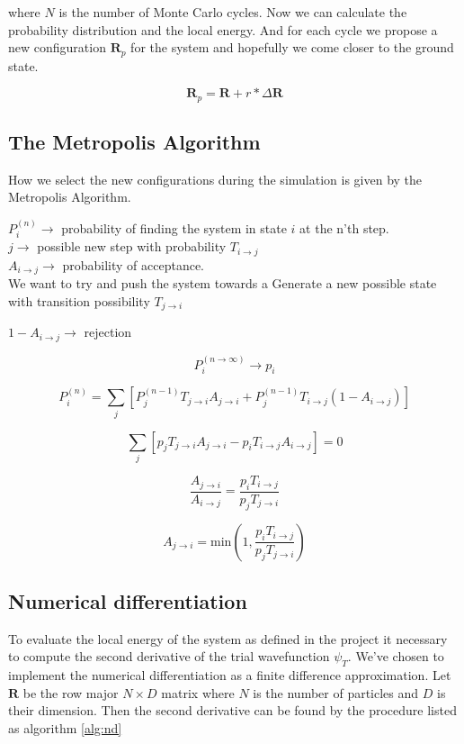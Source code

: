 where $N$ is the number of Monte Carlo cycles. Now we can calculate the probability distribution and the local energy. And for each cycle we propose a new configuration $\mathbf{R}_p$ for the system and hopefully we come closer to the ground state.

$$\mathbf{R}_p = \mathbf{R} + r \ast \Delta \mathbf{R}$$

\subsection{The Metropolis Algorithm}

How we select the new configurations during the simulation is given by the Metropolis Algorithm.

$P_i^{(n)} \rightarrow$ probability of finding the system in state $i$ at the n'th step.
\\
$j \rightarrow$ possible new step with probability $T_{i \rightarrow j}$
\\
$A_{i \rightarrow j} \rightarrow$ probability of acceptance. 
\\
We want to try and push the system towards a 
Generate a new possible state with transition possibility 
$T_{j \rightarrow i}$ 

$1 - A_{i \rightarrow j} \rightarrow$ rejection

$$P_i^{(n \rightarrow \infty)} \rightarrow p_i$$

$$P_i^{(n)} = \sum_j \left[P_j^{(n-1)} T_{j \rightarrow i}A_{j \rightarrow i} + P_j^{(n-1)}T_{i \rightarrow j}(1 - A_{i \rightarrow j})\right]$$

$$\sum_j [p_j T_{j \rightarrow i}A_{j \rightarrow i} - p_i T_{i \rightarrow j}A_{i \rightarrow j}] = 0$$

$$\frac{A_{j \rightarrow i}}{A_{i \rightarrow j}} = \frac{p_i T_{i \rightarrow j}}{p_j T_{j \rightarrow i}}$$

$$A_{j \rightarrow i} = \mathrm{min} \left( 1, \frac{p_i T_{i \rightarrow j}}{p_j T_{j \rightarrow i}}\right)$$

\subsection{Numerical differentiation}
To evaluate the local energy of the system as defined in the project it necessary to compute the second derivative of the trial wavefunction $\psi_T$. We've chosen to implement the numerical differentiation as a finite difference approximation. Let $\mathbf{R}$ be the row major $N \times D$ matrix where $N$ is the number of particles and $D$ is their dimension. Then the second derivative can be found by the procedure listed as algorithm \ref{alg:nd}


